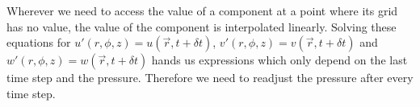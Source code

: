 \documentclass[12pt, a4paper]{article} %
\begin{document}
%			
			
			Wherever we need to access the value of a component at a point where its grid has no value, the value of the component is interpolated linearly. Solving these equations for $u'(r,\phi,z) = u(\vec{r}, t+\delta t)$, $v'(r,\phi,z) = v(\vec{r}, t+\delta t)$ and $w'(r,\phi,z) = w(\vec{r}, t+\delta t)$ hands us expressions which only depend on the last time step and the pressure. Therefore we need to readjust the pressure after every time step.
			
\end{document}

